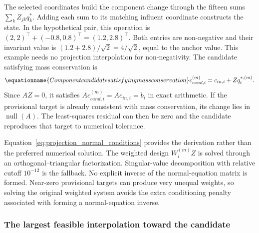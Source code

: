 The selected coordinates build the component change through the fifteen sums $\sum_kZ_{jk}q_k^*$. Adding each sum to its matching influent coordinate constructs the state. In the hypothetical pair, this operation is $(2,2)^\top+(-0.8,0.8)^\top=(1.2,2.8)^\top$. Both entries are non-negative and their invariant value is $(1.2+2.8)/\sqrt2=4/\sqrt2$, equal to the anchor value. This example needs no projection interpolation for non-negativity. The candidate satisfying mass conservation is
\begin{equation}
\equationname{Component candidate satisfying mass conservation}
c_{cand,i}^{(m)}=c_{in,i}+Zq_i^{*,(m)}.
\label{eq:projection_conservative_candidate}
\end{equation}
Since $AZ=0$, it satisfies $Ac_{cand,i}^{(m)}=Ac_{in,i}=b_i$ in exact arithmetic. If the provisional target is already consistent with mass conservation, its change lies in $\operatorname{null}(A)$. The least-squares residual can then be zero and the candidate reproduces that target to numerical tolerance.

Equation~\eqref{eq:projection_normal_conditions} provides the derivation rather than the preferred numerical solution. The weighted design $W_i^{(m)}Z$ is solved through an orthogonal--triangular factorization. Singular-value decomposition with relative cutoff $10^{-12}$ is the fallback. No explicit inverse of the normal-equation matrix is formed. Near-zero provisional targets can produce very unequal weights, so solving the original weighted system avoids the extra conditioning penalty associated with forming a normal-equation inverse.

\subsubsection{The largest feasible interpolation toward the candidate}

